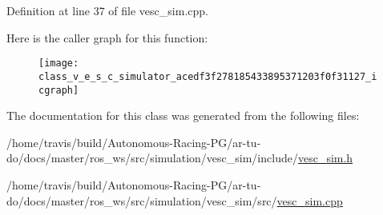 Definition at line 37 of file vesc\+\_\+sim.\+cpp.



Here is the caller graph for this function\+:
\nopagebreak
\begin{figure}[H]
\begin{center}
\leavevmode
\texttt{[image: class\_v\_e\_s\_c\_simulator\_acedf3f278185433895371203f0f31127\_icgraph]}
\end{center}
\end{figure}




The documentation for this class was generated from the following files\+:\begin{DoxyCompactItemize}
\item 
/home/travis/build/\+Autonomous-\/\+Racing-\/\+P\+G/ar-\/tu-\/do/docs/master/ros\+\_\+ws/src/simulation/vesc\+\_\+sim/include/\hyperlink{vesc__sim_8h}{vesc\+\_\+sim.\+h}\item 
/home/travis/build/\+Autonomous-\/\+Racing-\/\+P\+G/ar-\/tu-\/do/docs/master/ros\+\_\+ws/src/simulation/vesc\+\_\+sim/src/\hyperlink{vesc__sim_8cpp}{vesc\+\_\+sim.\+cpp}\end{DoxyCompactItemize}
